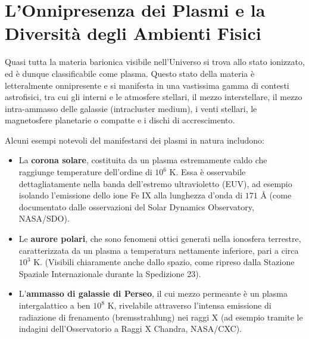 \section{L'Onnipresenza dei Plasmi e la Diversità degli Ambienti Fisici}

Quasi tutta la materia barionica visibile nell'Universo si trova allo stato ionizzato, ed è dunque classificabile come plasma. Questo stato della materia è letteralmente onnipresente e si manifesta in una vastissima gamma di contesti astrofisici, tra cui gli interni e le atmosfere stellari, il mezzo interstellare, il mezzo intra-ammasso delle galassie (intracluster medium), i venti stellari, le magnetosfere planetarie o compatte e i dischi di accrescimento.

Alcuni esempi notevoli del manifestarsi dei plasmi in natura includono:
\begin{itemize}
\item La \textbf{corona solare}, costituita da un plasma estremamente caldo che raggiunge temperature dell'ordine di $10^6 \text{ K}$. Essa è osservabile dettagliatamente nella banda dell'estremo ultravioletto (EUV), ad esempio isolando l'emissione dello ione Fe IX alla lunghezza d'onda di $171 \text{ \AA}$ (come documentato dalle osservazioni del Solar Dynamics Observatory, NASA/SDO).
\item Le \textbf{aurore polari}, che sono fenomeni ottici generati nella ionosfera terrestre, caratterizzata da un plasma a temperatura nettamente inferiore, pari a circa $10^3 \text{ K}$. (Visibili chiaramente anche dallo spazio, come ripreso dalla Stazione Spaziale Internazionale durante la Spedizione 23).
\item L'\textbf{ammasso di galassie di Perseo}, il cui mezzo permeante è un plasma intergalattico a ben $10^8 \text{ K}$, rivelabile attraverso l'intensa emissione di radiazione di frenamento (bremsstrahlung) nei raggi X (ad esempio tramite le indagini dell'Osservatorio a Raggi X Chandra, NASA/CXC).
\end{itemize}

